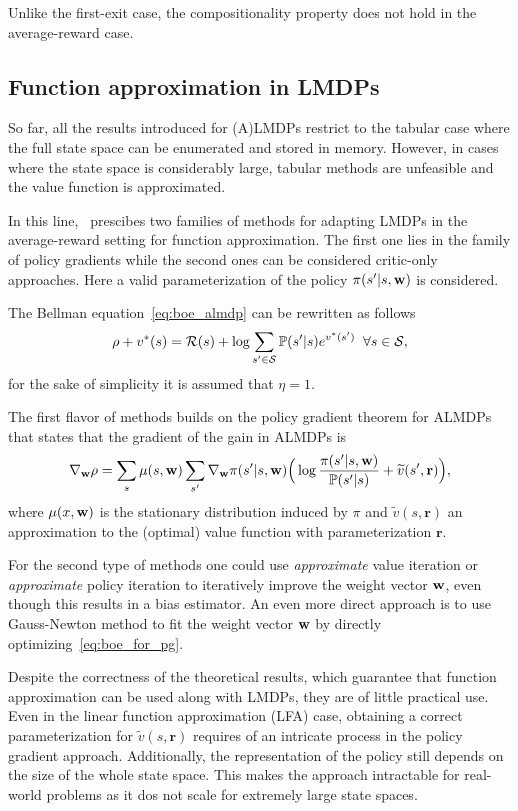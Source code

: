 Unlike the first-exit case, the compositionality property does not hold in the average-reward case.

\subsection{Function approximation in LMDPs}

So far, all the results introduced for (A)LMDPs restrict to the tabular case where the full state space can be enumerated and stored in memory. However, in cases where the state space is considerably large, tabular methods are unfeasible and the value function is approximated.

In this line,~\cite{Todorov2010} prescibes two families of methods for adapting LMDPs in the average-reward setting for function approximation. The first one lies in the family of policy gradients while the second ones can be considered critic-only approaches. Here a valid parameterization of the policy $\pi(s'\lvert s, \mathbf{w})$ is considered.

The Bellman equation~\eqref{eq:boe_almdp} can be rewritten as follows
\begin{equation}
\label{eq:boe_for_pg}
\rho + v^*(s) =\mathcal{R}(s) +\log{\sum_{s'\in\mathcal{S}}\mathbb{P}(s'\lvert s)e^{v^*(s')}} \;\;\forall s\in\mathcal{S},
\end{equation}
for the sake of simplicity it is assumed that $\eta=1$. 

The first flavor of methods builds on the policy gradient theorem for ALMDPs~\citep[cf.~Theorem 1]{Todorov2010} that states that the gradient of the gain in ALMDPs is
\begin{equation}
  \nabla_{\mathbf{w}} \rho = \sum_{s}\mu(s, \mathbf{w}) \sum_{s'} \nabla_{\mathbf{w}} \pi(s'\lvert s, \mathbf{w})\Big( \log \frac{\pi(s'\lvert s, \mathbf{w})}{\mathbb{P}(s'\lvert s)} + \widetilde v(s', \mathbf{r})\Big),
\end{equation}
where $\mu(x, \mathbf{w})$ is the stationary distribution induced by $\pi$ and $\widetilde v(s,\mathbf{r})$ an approximation to the (optimal) value function with parameterization $\mathbf r$.

For the second type of methods one could use \textit{approximate} value iteration or \textit{approximate} policy iteration to iteratively improve the weight vector $\mathbf{w}$, even though this results in a bias estimator. An even more direct approach is to use Gauss-Newton method to fit the weight vector $\mathbf{w}$ by directly optimizing~\eqref{eq:boe_for_pg}.

Despite the correctness of the theoretical results, which guarantee that function approximation can be used along with LMDPs, they are of little practical use. Even in the linear function approximation (LFA) case, obtaining a correct parameterization for $\widetilde v(s,\mathbf{r})$ requires of an intricate process in the policy gradient approach. Additionally, the representation of the policy still depends on the size of the whole state space. This makes the approach intractable for real-world problems as it dos not scale for extremely large state spaces.


